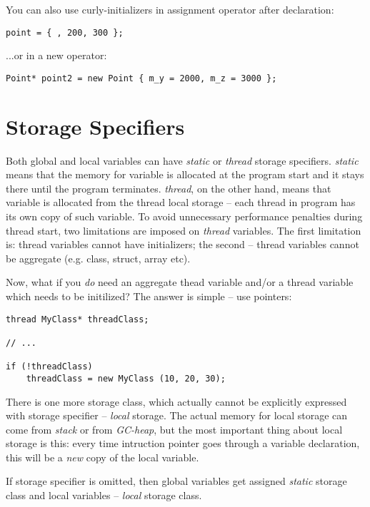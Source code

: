 \documentclass[oneside]{book}
\begin{document}
You can also use curly-initializers in assignment operator after declaration:

\begin{lstlisting}
point = { , 200, 300 };
\end{lstlisting}

...or in a new operator:

\begin{lstlisting}
Point* point2 = new Point { m_y = 2000, m_z = 3000 };
\end{lstlisting}

\section{Storage Specifiers}

Both global and local variables can have \emph{static} or \emph{thread} storage specifiers. \emph{static} means that the memory for variable is allocated at the program start and it stays there until the program terminates. \emph{thread}, on the other hand, means that variable is allocated from the thread local storage -- each thread in program has its own copy of such variable. To avoid unnecessary performance penalties during thread start, two limitations are imposed on \emph{thread} variables. The first limitation is: thread variables cannot have initializers; the second -- thread variables cannot be aggregate (e.g. class, struct, array etc). 

Now, what if you \emph{do} need an aggregate thead variable and/or a thread variable which needs to be initilized? The answer is simple -- use pointers:

\begin{lstlisting}
thread MyClass* threadClass;

// ...

if (!threadClass)
	threadClass = new MyClass (10, 20, 30);
\end{lstlisting}

There is one more storage class, which actually cannot be explicitly expressed with storage specifier -- \emph{local} storage. The actual memory for local storage can come from \emph{stack} or from \emph{GC-heap}, but the most important thing about local storage is this: every time intruction pointer goes through a variable declaration, this will be a \emph{new} copy of the local variable.

If storage specifier is omitted, then global variables get assigned \emph{static} storage class and local variables -- \emph{local} storage class.
\end{document}
